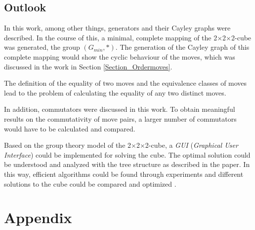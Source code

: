 \documentclass[12pt,a4paper]{article}
\theoremstyle{custom}
\newcommand{\Ttwo}{2$\times$2$\times$2-}
\begin{document}
\subsection*{Outlook}

In this work, among other things, generators and their Cayley graphs were described. In the course of this, a minimal, complete mapping of the \Ttwo cube was generated, the group $\left(G_{min}, \scriptstyle*\right)$. The generation of the Cayley graph of this complete mapping would show the cyclic behaviour of the moves, which was discussed in the work in Section \ref{Section_Ordermoves}.  


The definition of the equality of two moves and the equivalence classes of moves lead to the problem of calculating the equality of any two distinct moves.

In addition, commutators were discussed in this work. To obtain meaningful results on the commutativity of move pairs, a larger number of commutators would have to be calculated and compared. 


Based on the group theory model of the \Ttwo cube, a \textit{GUI} (\textit{Graphical User Interface}) could be implemented for solving the cube. The optimal solution could be understood and analyzed with the tree structure as described in the paper. In this way, efficient algorithms could be found through experiments and different solutions to the cube could be compared and optimized \cite{article,kaurstudy}. 
\newpage
\section*{Appendix}
\appendix

\newpage

\newpage

\newpage

\newpage

\newpage
%
%
\printbibliography
\end{document}
